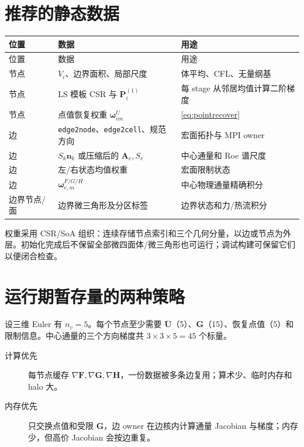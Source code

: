 \documentclass[UTF8,a4paper,11pt,openany]{ctexrep}
\numberwithin{equation}{chapter}
\newcommand{\Ubar}{\overline{\bm U}}
\newcommand{\grad}{\nabla}
\newcommand{\code}[1]{\texttt{#1}}
\begin{document}
\section{推荐的静态数据}

\begin{longtable}{>{\raggedright\arraybackslash}p{}>{\raggedright\arraybackslash}p{}p{}}
\toprule
位置 & 数据 & 用途\\
\midrule
\endfirsthead
\toprule
位置 & 数据 & 用途\\
\midrule
\endhead
节点 & $V_i$、边界面积、局部尺度 & 体平均、CFL、无量纲基\\
节点 & LS 模板 CSR 与 $\bm P_i^{(1)}$ & 每 stage 从邻居均值计算二阶梯度\\
节点 & 点值恢复权重 $\bm\omega^U_{im}$ & \cref{eq:pointrecover}\\
边 & \code{edge2node}、\code{edge2cell}、规范方向 & 宏面拓扑与 MPI owner\\
边 & $S_k\bm n_k$ 或压缩后的 $\bm A_e,S_e$ & 中心通量和 Roe 谱尺度\\
边 & 左/右状态均值权重 & 宏面限制状态\\
边 & $\bm\omega^{F/G/H}_{e,m}$ & 中心物理通量精确积分\\
边界节点/面 & 边界微三角形及分区标签 & 边界状态和力/热流积分\\
\bottomrule
\end{longtable}

权重采用 CSR/SoA 组织：连续存储节点索引和三个几何分量，以边或节点为外层。初始化完成后不保留全部微四面体/微三角形也可运行；调试构建可保留它们以便闭合检查。

\section{运行期暂存量的两种策略}

设三维 Euler 有 $n_v=5$。每个节点至少需要 $\Ubar$（5）、$\bm G$（15）、恢复点值（5）和限制信息。中心通量的三个方向梯度共 $3\times3\times5=45$ 个标量。

\begin{description}
  \item[计算优先] 每节点缓存 $\grad\bm F,\grad\bm G,\grad\bm H$，一份数据被多条边复用；算术少、临时内存和 halo 大。
  \item[内存优先] 只交换点值和受限 $\bm G$，边 owner 在边核内计算通量 Jacobian 与梯度；内存少，但高价 Jacobian 会按边重复。
\end{description}
\end{document}
